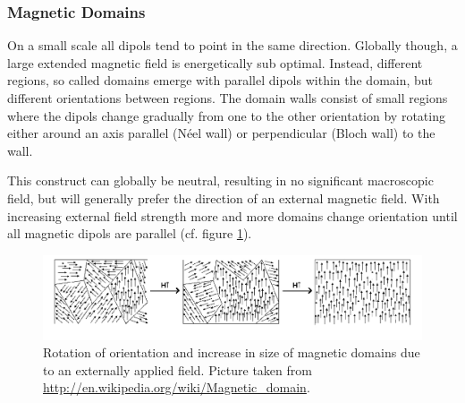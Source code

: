 \documentclass[a4paper]{scrartcl}
\numberwithin{equation}{section}
\numberwithin{figure}{section}
\numberwithin{table}{section}
\begin{document}
\subsubsection*{Magnetic Domains}
On a small scale all dipols tend to point in the same direction. Globally though, a large extended magnetic field is energetically sub optimal. Instead, different regions, so called domains emerge with parallel dipols within the domain, but different orientations between regions. The domain walls consist of small regions where the dipols change gradually from one to the other orientation by rotating either around an axis parallel (N\'{e}el wall) or perpendicular (Bloch wall) to the wall.

This construct can globally be neutral, resulting in no significant macroscopic field, but will generally prefer the direction of an external magnetic field. With increasing external field strength more and more domains change orientation until all magnetic dipols are parallel (cf. figure \ref{fig:doms}).
\begin{figure}
        \begin{center}
         \includegraphics[width=0.9\linewidth]{img/Dominios.pdf}
        \end{center}
        \caption{
\small Rotation of orientation and increase in size of magnetic domains due to an externally applied field. Picture taken from \url{http://en.wikipedia.org/wiki/Magnetic_domain}.
        }
        \label{fig:doms}
\end{figure}
\end{document}
